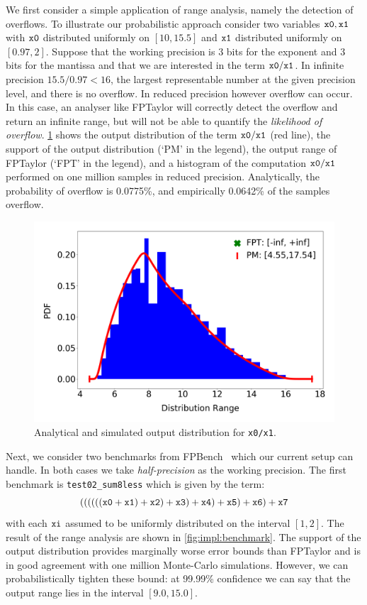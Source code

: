 \documentclass[10pt,conference]{IEEEtran}
\begin{document}
We first consider a simple application of range analysis, namely the detection of overflows. To illustrate our probabilistic approach consider two variables $\tt x0, x1$ with $\tt x0$ distributed uniformly on $\left[10, 15.5\right]$ and $\tt x1$ distributed uniformly on $\left[0.97,2\right]$. Suppose that the working precision is 3 bits for the exponent and 3 bits for the mantissa and that we are interested in the term $\tt x0/x1$. In infinite precision $15.5/0.97 < 16$, the largest representable number at the given precision level, and there is no overflow. In reduced precision however overflow can occur. In this case, an analyser like FPTaylor will correctly detect the overflow and return an infinite range, but will not be able to quantify the \emph{likelihood of overflow}. \cref{fig:impl:div} shows the output distribution of the term $\tt x0/x1$ (red line), the support of the output distribution (`PM' in the legend), the output range of FPTaylor (`FPT' in the legend), and a histogram of the computation $\tt x0/x1$ performed on one million samples in reduced precision. Analytically, the probability of overflow is 0.0775\%, and empirically 0.0642\% of the samples overflow.

\begin{figure}[h!]
\includegraphics[scale=0.22]{pics/range_dist_div}
\caption{Analytical and simulated output distribution for \texttt{x0/x1}.}
\label{fig:impl:div}
\end{figure}

Next, we consider two benchmarks from FPBench~\cite{fpbench} which our current setup can handle. In both cases we take \emph{half-precision} as the working precision. The first benchmark is \texttt{test02\_sum8less} which is given by the term: 
\[
\tt{((((((x0 + x1) + x2) + x3) + x4) + x5) + x6) + x7}
\]
with each $\tt xi$ assumed to be uniformly distributed on the interval $\left[1,2\right]$. The result of the range analysis are shown in \cref{fig:impl:benchmark}. The support of the output distribution provides marginally worse error bounds than FPTaylor and is in good agreement with one million Monte-Carlo simulations. However, we can probabilistically tighten these bound: at 99.99\% confidence we can say that the output range lies in the interval $\left [9.0,15.0\right]$.
\end{document}

